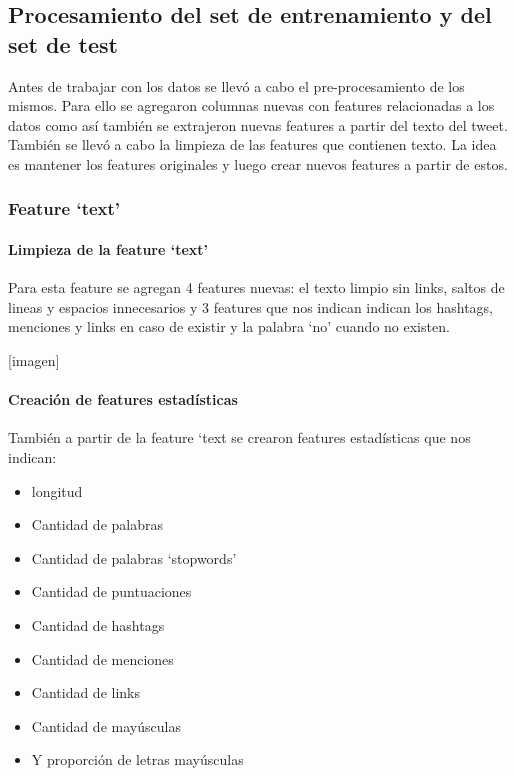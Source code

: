 \documentclass[12pt]{article}
\begin{document}
\subsection{Procesamiento del set de entrenamiento y del set de test}
Antes de trabajar con los datos se llevó a cabo el pre-procesamiento de los mismos.
Para ello se agregaron columnas nuevas con features relacionadas a los datos como así también se extrajeron nuevas features a partir del texto del tweet.
También se llevó a cabo la limpieza de las features que contienen texto.
La idea es mantener los features originales y luego crear nuevos features a partir de estos.


\subsubsection{Feature ‘text’}
\paragraph{Limpieza de la feature ‘text’\\}

Para esta feature se agregan 4 features nuevas: el texto limpio sin links, saltos de lineas y espacios innecesarios y 3 features que nos indican indican los hashtags, menciones y links en caso de existir y la palabra ‘no’ cuando no existen. 

[imagen]

\paragraph{Creación de features estadísticas\\}
\newline También a partir de la feature ‘text se crearon features estadísticas que nos indican:
\begin{itemize}
  \item longitud
  \item Cantidad de palabras
  \item Cantidad de palabras ‘stopwords’
  \item Cantidad de puntuaciones
  \item Cantidad de hashtags
  \item Cantidad de menciones
  \item Cantidad de links
  \item Cantidad de mayúsculas
  \item Y proporción de letras mayúsculas
\end{itemize}
\end{document}
